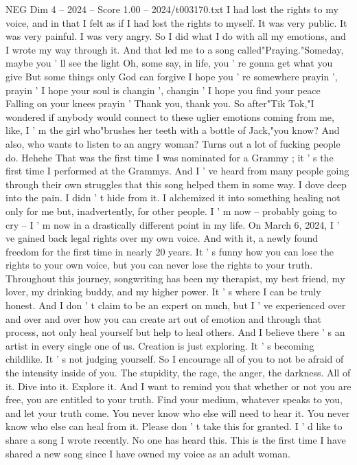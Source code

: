 \begin{textsample}{NEG Dim 4 – 2024 – Score 1.00 – 2024/t003170.txt}
I had lost the rights to my voice, and in that I felt as if I had lost the rights to myself.
It was very public.
It was very painful.
I was very angry.
So I did what I do with all my emotions, and I wrote my way through it.
And that led me to a song called"Praying."Someday, maybe you ' ll see the light Oh, some say, in life, you ' re gonna get what you give But some things only God can forgive I hope you ' re somewhere prayin ', prayin ' I hope your soul is changin ', changin ' I hope you find your peace Falling on your knees prayin ' Thank you, thank you.
So after"Tik Tok,"I wondered if anybody would connect to these uglier emotions coming from me, like, I ' m the girl who"brushes her teeth with a bottle of Jack,"you know?
And also, who wants to listen to an angry woman?
Turns out a lot of fucking people do.
Hehehe That was the first time I was nominated for a Grammy ; it ' s the first time I performed at the Grammys.
And I ' ve heard from many people going through their own struggles that this song helped them in some way.
I dove deep into the pain.
I didn ' t hide from it.
I alchemized it into something healing not only for me but, inadvertently, for other people.
I ' m now -- probably going to cry -- I ' m now in a drastically different point in my life.
On March 6, 2024, I ' ve gained back legal rights over my own voice.
And with it, a newly found freedom for the first time in nearly 20 years.
It ' s funny how you can lose the rights to your own voice, but you can never lose the rights to your truth.
Throughout this journey, songwriting has been my therapist, my best friend, my lover, my drinking buddy, and my higher power.
It ' s where I can be truly honest.
And I don ' t claim to be an expert on much, but I ' ve experienced over and over and over how you can create art out of emotion and through that process, not only heal yourself but help to heal others.
And I believe there ' s an artist in every single one of us.
Creation is just exploring.
It ' s becoming childlike.
It ' s not judging yourself.
So I encourage all of you to not be afraid of the intensity inside of you.
The stupidity, the rage, the anger, the darkness.
All of it.
Dive into it.
Explore it.
And I want to remind you that whether or not you are free, you are entitled to your truth.
Find your medium, whatever speaks to you, and let your truth come.
You never know who else will need to hear it.
You never know who else can heal from it.
Please don ' t take this for granted.
I ' d like to share a song I wrote recently.
No one has heard this.
This is the first time I have shared a new song since I have owned my voice as an adult woman.

\end{textsample}
